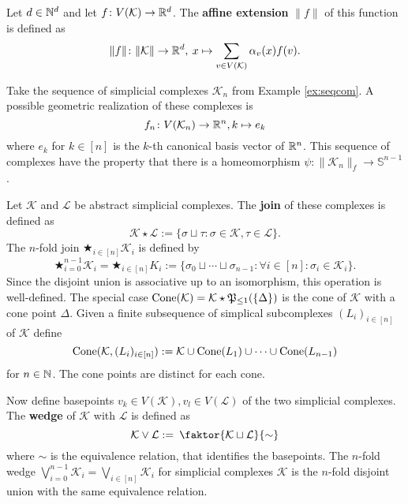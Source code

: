 \begin{defin}
  Let $d \in \mathbb{N}^d$ and let $f\colon V(\mathcal{K}) \to \mathbb{R}^d$. The \textbf{affine extension} $\lVert f \rVert$ of this function is defined as
  \begin{equation*}
    \lVert f \rVert\colon \lVert \mathcal{K} \rVert \to \mathbb{R}^d,\: x \mapsto \sum\limits_{v \in V(\mathcal{K})} \alpha_v(x) f(v).
  \end{equation*}
\end{defin}

\begin{ex}
  Take the sequence of simplicial complexes $\mathcal{K}_n$ from Example \ref{ex:seqcom}. A possible geometric realization of these complexes is
  \begin{equation*}
    f_n\colon V(\mathcal{K}_n) \to \mathbb{R}^n, k \mapsto e_k 
  \end{equation*}
  where $e_k$ for $k \in [n]$ is the $k$-th canonical basis vector of $\mathbb{R}^n$. This sequence of complexes have the property that there is a homeomorphism $\psi\colon \lVert \mathcal{K}_n \rVert_f \to \mathbb{S}^{n-1}$.
\end{ex}

\begin{defin}
  Let $\mathcal{K}$ and $\mathcal{L}$ be abstract simplicial complexes. The \textbf{join} of these complexes is defined as
  \begin{equation*}
    \mathcal{K} \star \mathcal{L} := \{\sigma \sqcup \tau\colon \sigma \in \mathcal{K}, \tau \in \mathcal{L} \}.
  \end{equation*}
  The $n$-fold join $\bigstar_{i \in [n]} \mathcal{K}_i$ is defined by
  \begin{equation*}
    \bigstar_{i=0}^{n-1} \mathcal{K}_i = \bigstar_{i \in [n]} K_i := \{\sigma_0 \sqcup \cdots \sqcup \sigma_{n-1}\colon \forall i\in [n]\colon \sigma_i \in \mathcal{K}_i\}.
  \end{equation*}
  Since the disjoint union is associative up to an isomorphism, this operation is well-defined.
  The special case ${\rm Cone}(\mathcal{K}) = \mathcal{K} \star \mathfrak{P}_{\leq 1}(\{ \Delta \})$ is the cone of $\mathcal{K}$ with a cone point $\Delta$. Given a finite subsequence of simplical subcomplexes $(L_i)_{i\in [n]}$ of $\mathcal{K}$ define \[{\rm Cone}(\mathcal{K}, (L_i)_{i\in [n]}) := \mathcal{K} \cup {\rm Cone}(L_1) \cup \cdots \cup {\rm Cone}(L_{n-1})\] for $n \in \mathbb{N}$. The cone points are distinct for each cone.

  
  Now define basepoints $v_k \in V(\mathcal{K}), v_l \in V(\mathcal{L})$ of the two simplicial complexes. The \textbf{wedge} of $\mathcal{K}$ with $\mathcal{L}$ is defined as
  \begin{equation*}
    \mathcal{K} \lor \mathcal{L} := \: \faktor{\mathcal{K} \sqcup \mathcal{L}}{\sim}
  \end{equation*}
  where $\sim$ is the equivalence relation, that identifies the basepoints.
  The $n$-fold wedge $\bigvee_{i=0}^{n-1} \mathcal{K}_i= \bigvee\limits_{i \in [n]} \mathcal{K}_i$ for simplicial complexes $\mathcal{K}$ is the $n$-fold disjoint union with the same equivalence relation.
\end{defin}

